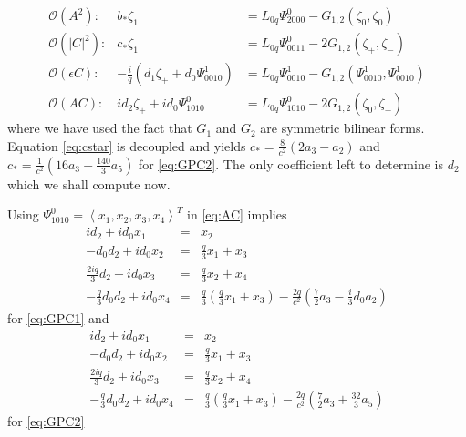 \begin{subequations}
\begin{eqnarray}
\mathcal{O}(A^2): &		b_* \zeta_1 &= L_{0q} \Psi_{2000}^0 - G_{1,2}(\zeta_0,\zeta_0) \\
\mathcal{O}(\left|C\right|^2):&	c_* \zeta_1 &= L_{0q} \Psi_{0011}^0 -2 G_{1,2}(\zeta_+,\zeta_-) \label{eq:cstar} \\
\mathcal{O}(\epsilon C): &-\frac{i}{q} \left(d_1 \zeta_+ +  d_0 \Psi_{0010}^1\right) &= L_{0q} \Psi_{0010}^1 - G_{1,2}(\Psi_{0010}^1,\Psi_{0010}^1) \\
\mathcal{O}(A C): 	&i d_2 \zeta_+ + i d_0 \Psi_{1010}^0 &= L_{0q} \Psi_{1010}^0 - 2 G_{1,2}(\zeta_0,\zeta_+)  \label{eq:AC}
\end{eqnarray}
\end{subequations}
where we have used the fact that $G_1$ and $G_2$ are symmetric bilinear forms. Equation \eqref{eq:cstar} is decoupled and yields 
$ c_* = \frac{8}{c^2}\left( 2 a_3 - a_2 \right)$
and 
$ c_* = \frac{1}{c^2}\left( 16 a_3 + \frac{140}{3} a_5 \right) $
for \eqref{eq:GPC2}.  The only coefficient left to determine is $d_2$ which we shall compute now. 

Using $\Psi_{1010}^0 = \left<x_1,x_2,x_3,x_4\right>^T$ in \eqref{eq:AC} implies 
\begin{subequations}
\begin{eqnarray}
i d_2 + i d_0 x_1 &=& x_2 \label{eq:gpc1one} \\
- d_0 d_2 + i d_0 x_2 &=& \frac{q}{3} x_1 + x_3 \label{eq:gpc1two} \\
\frac{2 i q}{3} d_2 + i d_0 x_3 &=& \frac{q}{3} x_2 + x_4  \label{eq:gpc1three} \\
- \frac{q}{3} d_0 d_2 + i d_0 x_4 &=& \frac{q}{3}\left(\frac{q}{3} x_1 + x_3 \right) - \frac{ 2 q}{c^2}\left(\frac{7}{2} a_3 - \frac{i}{3} d_0 a_2\right) \label{eq:gpc1four}
\end{eqnarray}
\end{subequations}
for \eqref{eq:GPC1} and
\begin{subequations}
\begin{eqnarray}
i d_2 + i d_0 x_1 &=& x_2 \label{eq:gpc2one} \\
- d_0 d_2 + i d_0 x_2 &=& \frac{q}{3} x_1 + x_3 \label{eq:gpc2two} \\
\frac{2 i q}{3} d_2 + i d_0 x_3 &=& \frac{q}{3} x_2 + x_4  \label{eq:gpc2three} \\
- \frac{q}{3} d_0 d_2 + i d_0 x_4 &=& \frac{q}{3}\left(\frac{q}{3} x_1 + x_3 \right) - \frac{2 q}{c^2}\left( \frac{7}{2} a_3 + \frac{32}{3} a_5\right) \label{eq:gpc2four}
\end{eqnarray}
\end{subequations}
for \eqref{eq:GPC2}

